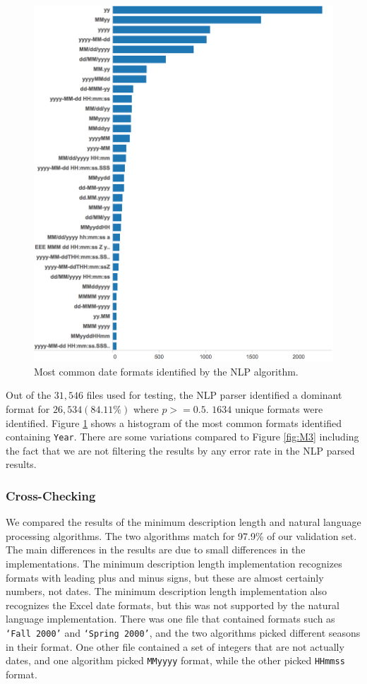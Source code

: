 \begin{figure}[ht]
\centering
\includegraphics[width=\columnwidth]{figures/FigureNLP1}
\caption{Most common date formats identified by the NLP algorithm.}
\label{fig:NLP1}
\end{figure}


Out of the $31,546$ files used for testing, the NLP parser identified a dominant format for $26, 534 (84.11\%)$ where $p >= 0.5$. $1634$ unique formats were identified. Figure \ref{fig:NLP1} shows a histogram of the most common formats identified containing \texttt{Year}. There are some variations compared to Figure \ref{fig:M3} including the fact that we are not filtering the results by any error rate in the NLP parsed results.




\subsubsection{Cross-Checking}
We compared the results of the minimum description length and natural language processing algorithms. The two algorithms match for 97.9\% of our validation set. The main differences in the results are due to small differences in the implementations. The minimum description length implementation recognizes formats with leading plus and minus signs, but these are almost certainly numbers, not dates. The minimum description length implementation also recognizes the Excel date formats, but this was not supported by the natural language implementation. There was one file that contained formats such as \texttt{`Fall 2000'} and \texttt{`Spring 2000'}, and the two algorithms picked different seasons in their format. One other file contained a set of integers that are not actually dates, and one algorithm picked \texttt{MMyyyy} format, while the other picked \texttt{HHmmss} format.
